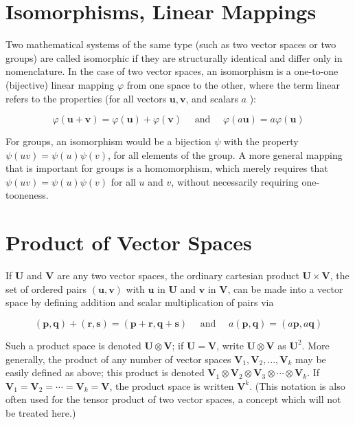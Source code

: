 \documentclass[10pt]{article}
\begin{document}
\section*{Isomorphisms, Linear Mappings}
Two mathematical systems of the same type (such as two vector spaces or two groups) are called isomorphic if they are structurally identical and differ only in nomenclature. In the case of two vector spaces, an isomorphism is a one-to-one (bijective) linear mapping $\varphi$ from one space to the other, where the term linear refers to the properties (for all vectors $\mathbf{u}, \mathbf{v}$, and scalars $a$ ):


\begin{equation*}
\varphi(\mathbf{u}+\mathbf{v})=\varphi(\mathbf{u})+\varphi(\mathbf{v}) \quad \text { and } \quad \varphi(a \mathbf{u})=a \varphi(\mathbf{u}) \tag{13.1}
\end{equation*}


For groups, an isomorphism would be a bijection $\psi$ with the property $\psi(u v)=\psi(u) \psi(v)$, for all elements of the group. A more general mapping that is important for groups is a homomorphism, which merely requires that $\psi(u v)=\psi(u) \psi(v)$ for all $u$ and $v$, without necessarily requiring one-tooneness.

\section*{Product of Vector Spaces}
If $\mathbf{U}$ and $\mathbf{V}$ are any two vector spaces, the ordinary cartesian product $\mathbf{U} \times \mathbf{V}$, the set of ordered pairs $(\mathbf{u}, \mathbf{v})$ with $\mathbf{u}$ in $\mathbf{U}$ and $\mathbf{v}$ in $\mathbf{V}$, can be made into a vector space by defining addition and scalar multiplication of pairs via

$$
(\mathbf{p}, \mathbf{q})+(\mathbf{r}, \mathbf{s})=(\mathbf{p}+\mathbf{r}, \mathbf{q}+\mathbf{s}) \quad \text { and } \quad a(\mathbf{p}, \mathbf{q})=(a \mathbf{p}, a \mathbf{q})
$$

Such a product space is denoted $\mathbf{U} \otimes \mathbf{V}$; if $\mathbf{U}=\mathbf{V}$, write $\mathbf{U} \otimes \mathbf{V}$ as $\mathbf{U}^{2}$. More generally, the product of any number of vector spaces $\mathbf{V}_{1}, \mathbf{V}_{2}, \ldots, \mathbf{V}_{k}$ may be easily defined as above; this product is denoted $\mathbf{V}_{1} \otimes \mathbf{V}_{2} \otimes \mathbf{V}_{3} \otimes \cdots \otimes \mathbf{V}_{k}$. If $\mathbf{V}_{1}=\mathbf{V}_{2}=\cdots=\mathbf{V}_{k}=\mathbf{V}$, the product space is written $\mathbf{V}^{k}$. (This notation is also often used for the tensor product of two vector spaces, a concept which will not be treated here.)
\end{document}
